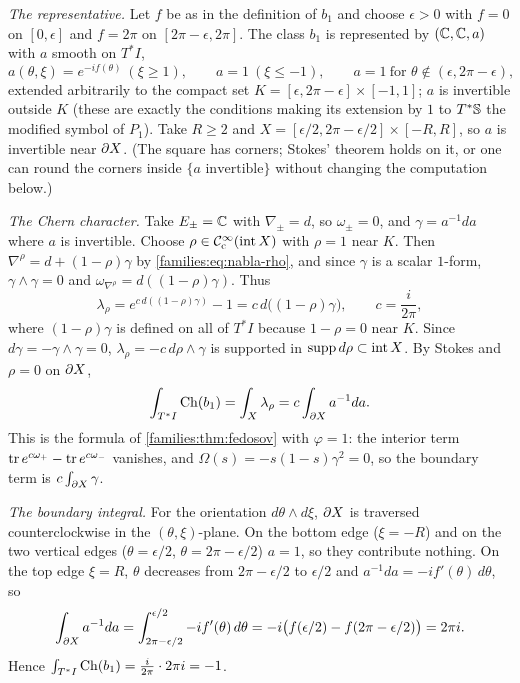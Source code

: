 \emph{The representative.} Let $f$ be as in the definition of $b_1$ and choose
$\epsilon>0$ with $f=0$ on $[0,\epsilon]$ and $f=2\pi$ on $[2\pi-\epsilon,2\pi]$. The class
$b_1$ is represented by $(\mathbb{C},\mathbb{C},a)$ with $a$ smooth on $T^*I$,
\begin{equation*}
a(\theta,\xi)=e^{-if(\theta)}\ (\xi\ge1),\qquad a=1\ (\xi\le-1),\qquad a=1\ \text{for }
\theta\notin(\epsilon,2\pi-\epsilon),
\end{equation*}
extended arbitrarily to the compact set $K=[\epsilon,2\pi-\epsilon]\times[-1,1]$; $a$ is
invertible outside $K$ (these are exactly the conditions making its extension by $1$
to $T^*\mathbb{S}$ the modified symbol of $P_1$). Take $R\ge2$ and
$X=[\epsilon/2,2\pi-\epsilon/2]\times[-R,R]$, so $a$ is invertible near $\partial X$. (The
square has corners; Stokes' theorem holds on it, or one can round the corners inside
$\{a\text{ invertible}\}$ without changing the computation below.)

\emph{The Chern character.} Take $E_\pm=\mathbb{C}$ with $\nabla_\pm=d$, so $\omega_\pm=0$, and
$\gamma=a^{-1}da$ where $a$ is invertible. Choose $\rho\in\mathcal{C}^\infty_{\mathrm{c}}(\operatorname{int}X)$
with $\rho=1$ near $K$. Then $\nabla^\rho=d+(1-\rho)\gamma$ by
\eqref{families:eq:nabla-rho}, and since $\gamma$ is a scalar $1$-form,
$\gamma\wedge\gamma=0$ and $\omega_{\nabla^\rho}=d((1-\rho)\gamma)$. Thus
\begin{equation*}
\lambda_\rho=e^{c\,d((1-\rho)\gamma)}-1=c\,d\bigl((1-\rho)\gamma\bigr),\qquad c=\frac
i{2\pi},
\end{equation*}
where $(1-\rho)\gamma$ is defined on all of $T^*I$ because $1-\rho=0$ near $K$. Since
$d\gamma=-\gamma\wedge\gamma=0$, $\lambda_\rho=-c\,d\rho\wedge\gamma$ is supported in
$\operatorname{supp} d\rho\subset\operatorname{int}X$. By
Stokes and $\rho=0$ on $\partial X$,
\begin{equation*}
\int_{T^*I}\operatorname{Ch}(b_1)=\int_X\lambda_\rho=c\int_{\partial X}a^{-1}da .
\end{equation*}
This is the formula of \cref{families:thm:fedosov} with $\varphi=1$: the interior term
$\operatorname{tr} e^{c\omega_+}-\operatorname{tr} e^{c\omega_-}$ vanishes, and $\Omega(s)=-s(1-s)\gamma^2=0$, so the
boundary term is $c\int_{\partial X}\gamma$.

\emph{The boundary integral.} For the orientation $d\theta\wedge d\xi$, $\partial X$ is
traversed counterclockwise in the $(\theta,\xi)$-plane. On the bottom edge
($\xi=-R$) and on the two vertical edges ($\theta=\epsilon/2$, $\theta=2\pi-\epsilon/2$)
$a=1$, so they contribute nothing. On the top edge $\xi=R$, $\theta$ decreases from
$2\pi-\epsilon/2$ to $\epsilon/2$ and $a^{-1}da=-if'(\theta)\,d\theta$, so
\begin{equation*}
\int_{\partial X}a^{-1}da=\int_{2\pi-\epsilon/2}^{\epsilon/2}-if'(\theta)\,d\theta
=-i\bigl(f(\epsilon/2)-f(2\pi-\epsilon/2)\bigr)=2\pi i .
\end{equation*}
Hence $\int_{T^*I}\operatorname{Ch}(b_1)=\frac{i}{2\pi}\cdot2\pi i=-1$.

